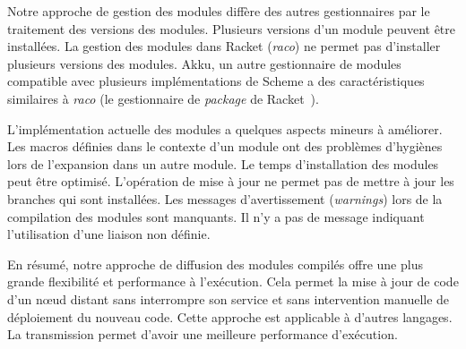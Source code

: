 Notre approche de gestion des modules diffère des autres gestionnaires par le
traitement des versions des modules. Plusieurs versions d'un module peuvent
être installées. La gestion des modules dans Racket (\textit{raco}) ne permet
pas d'installer plusieurs versions des modules. Akku, un autre gestionnaire de
modules compatible avec plusieurs implémentations de Scheme a des
caractéristiques similaires à \textit{raco} (le gestionnaire de
\textit{package} de Racket~\cite{Racket}).

L'implémentation actuelle des modules a quelques aspects mineurs à améliorer.
Les macros définies dans le contexte d'un module ont des problèmes d'hygiènes
lors de l'expansion dans un autre module. Le temps d'installation des modules
peut être optimisé. L'opération de mise à jour ne permet pas de mettre à jour
les branches qui sont installées.  Les messages d'avertissement
(\textit{warnings}) lors de la compilation des modules sont manquants. Il n'y a
pas de message indiquant l'utilisation d'une liaison non définie.


En résumé, notre approche de diffusion des modules compilés offre une
plus grande flexibilité et performance à l'exécution. Cela permet la mise à jour de
code d'un nœud distant sans interrompre son service et sans intervention
manuelle de déploiement du nouveau code. Cette approche
est applicable à d'autres langages. La transmission permet d'avoir
une meilleure performance d'exécution.


